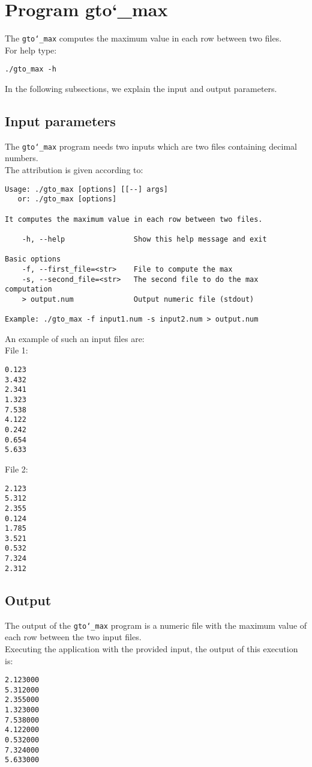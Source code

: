 \section{Program gto\char`_max}
The \texttt{gto\char`_max} computes the maximum value in each row between two files.\\
For help type:
\begin{lstlisting}
./gto_max -h
\end{lstlisting}
In the following subsections, we explain the input and output parameters.

\subsection*{Input parameters}

The \texttt{gto\char`_max} program needs two inputs which are two files containing decimal numbers.\\

The attribution is given according to:
\begin{lstlisting}
Usage: ./gto_max [options] [[--] args]
   or: ./gto_max [options]

It computes the maximum value in each row between two files.

    -h, --help                Show this help message and exit

Basic options
    -f, --first_file=<str>    File to compute the max
    -s, --second_file=<str>   The second file to do the max computation
    > output.num              Output numeric file (stdout)

Example: ./gto_max -f input1.num -s input2.num > output.num
\end{lstlisting}
An example of such an input files are:\\
File 1:
\begin{lstlisting}
0.123
3.432
2.341
1.323
7.538
4.122
0.242
0.654
5.633
\end{lstlisting}
File 2:
\begin{lstlisting}
2.123
5.312
2.355
0.124
1.785
3.521
0.532
7.324
2.312
\end{lstlisting}

\subsection*{Output}
The output of the \texttt{gto\char`_max} program is a numeric file with the maximum value of each row between the two input files.\\
Executing the application with the provided input, the output of this execution is:
\begin{lstlisting}
2.123000
5.312000
2.355000
1.323000
7.538000
4.122000
0.532000
7.324000
5.633000
\end{lstlisting}